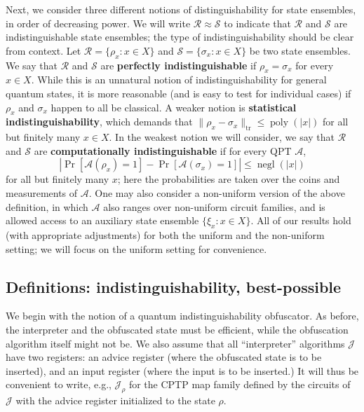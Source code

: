 \documentclass[11pt]{article}
\numberwithin{equation}{section}
\newcommand{\opn}{\operatorname}
\newcommand{\algo}{\mathcal}
\newcommand{\negl}{\opn{negl}}
\newcommand{\poly}{\opn{poly}}
\begin{document}
{Next, we consider three different notions of distinguishability for state ensembles, in order of decreasing power. We will write $\mathcal R \approx \mathcal S$ to indicate that $\mathcal R$ and $\mathcal S$ are indistinguishable state ensembles; the type of indistinguishability should be clear from context. Let $\mathcal R = \{\rho_x : x \in X\}$ and $\mathcal S = \{\sigma_x : x \in X\}$ be two state ensembles. We say that $\mathcal R$ and $\mathcal S$ are \textbf{perfectly indistinguishable} if $\rho_x = \sigma_x$ for every $x \in X$. While this is an unnatural notion of indistinguishability for general quantum states, it is more reasonable (and is easy to test for individual cases) if $\rho_x$ and $\sigma_x$ happen to all be classical. A weaker notion is \textbf{statistical indistinguishability}, which demands that $\|\rho_x - \sigma_x\|_\text{tr} \leq \poly(|x|)$ for all but finitely many $x \in X$. In the weakest notion we will consider, we say that $\mathcal R$ and $\mathcal S$ are \textbf{computationally indistinguishable} if for every QPT $\algo A$,
$$
\left|\Pr[\algo A(\rho_x) = 1] - \Pr[\algo A(\sigma_x) = 1]\right| \leq \negl(|x|)
$$
for all but finitely many $x$; here the probabilities are taken over the coins and measurements of $\algo A$. One may also consider a non-uniform version of the above definition, in which $\algo A$ also ranges over non-uniform circuit families, and is allowed access to an auxiliary state ensemble $\{\xi_x : x \in X\}$. All of our results hold (with appropriate adjustments) for both the uniform and the non-uniform setting; we will focus on the uniform setting for convenience. 

\subsection{Definitions: indistinguishability, best-possible}

We begin with the notion of a quantum indistinguishability obfuscator. As before, the interpreter and the obfuscated state must be efficient, while the obfuscation algorithm itself might not be. We also assume that all ``interpreter'' algorithms $\mathcal J$ have two registers: an advice register (where the obfuscated state is to be inserted), and an input register (where the input is to be inserted.) It will thus be convenient to write, e.g., $\mathcal J_{\rho}$ for the CPTP map family defined by the circuits of $\mathcal J$ with the advice register initialized to the state $\rho$.

}
\end{document}
